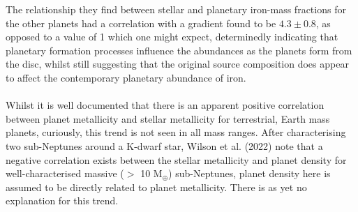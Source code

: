 \documentclass[a4paper,twocolumn,12pt]{article}
\begin{document}
The relationship they find between stellar and planetary iron-mass fractions for the other planets had a correlation with a gradient found to be $4.3\pm0.8$, as opposed to a value of 1 which one might expect, determinedly indicating that planetary formation processes influence the abundances as the planets form from the disc, whilst still suggesting that the original source composition does appear to affect the contemporary planetary abundance of iron.
%
%
\\\\Whilst it is well documented that there is an apparent positive correlation between planet metallicity and stellar metallicity for terrestrial, Earth mass planets, curiously, this trend is not seen in all mass ranges. After characterising two sub-Neptunes around a K-dwarf star, Wilson et al. (2022) \cite{Wilson} note that a negative correlation exists between the stellar metallicity and planet density for well-characterised massive ($>$ 10 M$_{\oplus}$) sub-Neptunes, planet density here is assumed to be directly related to planet metallicity. There is as yet no explanation for this trend.


\end{document}
